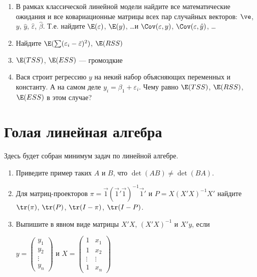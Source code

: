 \documentclass[pdftex,12pt,a4paper]{article}
\def \hb{\hat{\beta}}
\def \hy{\hat{y}}
\def \he{\hat{\varepsilon}}
\def \v1{\vec{1}}
\def \e{\varepsilon}
\newcommand{\solution}[1]{}
\newcommand{\problem}[1]{#1}
\begin{document}
\begin{enumerate}
\item В рамках классической линейной модели найдите все математические ожидания и все ковариационные матрицы всех пар случайных векторов: $\ve$, $y$, $\hy$, $\he$, $\hb$. Т.е. найдите $\E(\e)$, $\E(y)$, \ldots и $\Cov(\e,y)$, $\Cov(\e,\hy)$, \ldots
\solution{$\Var(\hb)=\sigma^2 (X'X)^{-1}$}

\item Найдите $\E(\sum (\e_i-\bar{\e})^2 )$, $\E(RSS)$
\solution{ $(n-1)\sigma^2$, $(n-k)\sigma^2$}

\item $\E(TSS)$, $\E(ESS)$ --- громоздкие 
\solution{ $\E(TSS)=(n-1)\sigma^2+\beta'X'(I-\pi)X\beta$}

\item Вася строит регрессию $y$ на некий набор объясняющих переменных и константу. А на самом деле $y_i=\beta_1+\e_i$. Чему равно $\E(TSS)$, $\E(RSS)$, $\E(ESS)$ в этом случае?
\solution{ $(n-1)\sigma^2$, $(n-k)\sigma^2$, $(k-1)\sigma^2$}

\end{enumerate}



\section{Голая линейная алгебра}

Здесь будет собран минимум задач по линейной алгебре.

\begin{enumerate}
\item \problem{Приведите пример таких $A$ и $B$, что $\det(AB)\neq \det(BA)$.}
\solution{Например, $A=(1,2,3)$, $B=(1,0,1)'$}

\item Для матриц-проекторов $\pi=\v1(\v1'\v1)^{-1}\v1'$ и $P=X(X'X)^{-1}X'$ найдите $\tr(\pi)$, $\tr(P)$, $\tr(I-\pi)$, $\tr(I-P)$.
\solution{$\tr(I)=n$, $\tr(\pi)=1$, $\tr(P)=k$ }

\item Выпишите в явном виде матрицы $X'X$, $(X'X)^{-1}$ и $X'y$, если

$y=\left(
\begin{array}{c}
y_1 \\
y_2 \\
\vdots \\
y_n 
\end{array}\right)$ и
$X=\left(
\begin{array}{cc}
1 & x_1 \\
1 & x_2 \\
\vdots & \vdots \\
1 & x_n 
\end{array}\right)$ 
\solution{ }

 
\end{enumerate}
\end{document}
